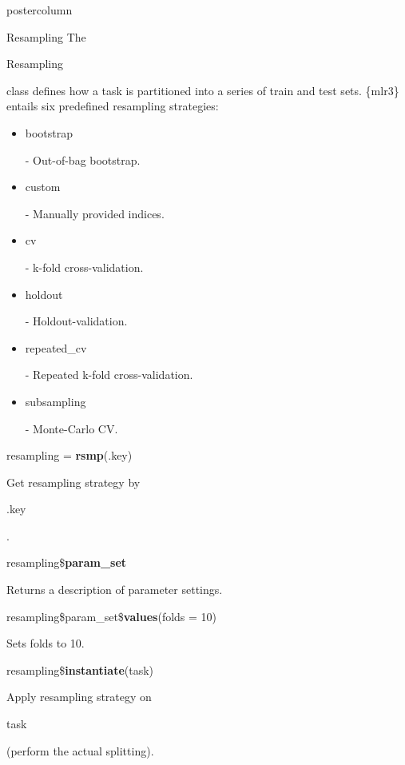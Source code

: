 \documentclass{beamer}
\newlength{\columnheight} %
\newcommand{\codeinline}[1]{\begin{codeboxinline}#1\end{codeboxinline}}
\begin{document}
\begin{withoutheader}
\begin{frame}[fragile]{}
	\begin{columns}
		\begin{column}{.245\textwidth}
			\begin{beamercolorbox}[center]{postercolumn}
				\begin{minipage}{.98\textwidth}
					\parbox[t][\columnheight]{\textwidth}{
							\begin{myblock}{Resampling}
							The \codeinline{Resampling} class defines how a task is
							partitioned into a series of train and test sets. \{mlr3\}
							entails six predefined resampling strategies:
							\\
							\begin{itemize}
								\item \codeinline{bootstrap} - Out-of-bag bootstrap.
								\item \codeinline{custom} - Manually provided indices.
								\item \codeinline{cv} - k-fold cross-validation.
								\item \codeinline{holdout} - Holdout-validation.
								\item \codeinline{repeated\_cv} - Repeated k-fold cross-validation.
								\item \codeinline{subsampling} - Monte-Carlo CV.
							\end{itemize}
							\vspace{1em}
							\begin{codebox}
								resampling = \textbf{rsmp}(.key)
							\end{codebox}
							Get resampling strategy by \codeinline{.key}.
							\\
							\begin{codebox}
								resampling\$\textbf{param\_set}
							\end{codebox}
							Returns a description of parameter settings.
							\\
							\begin{codebox}
								resampling\$param\_set\$\textbf{values}(folds = 10)
							\end{codebox}
							Sets folds to 10.
							\\
							\begin{codebox}
								resampling\$\textbf{instantiate}(task)
							\end{codebox}
							Apply resampling strategy on \codeinline{task} (perform
							the actual splitting).

\end{myblock}}
\end{minipage}
\end{beamercolorbox}
\end{column}
\end{columns}
\end{frame}
\end{withoutheader}
\end{document}
